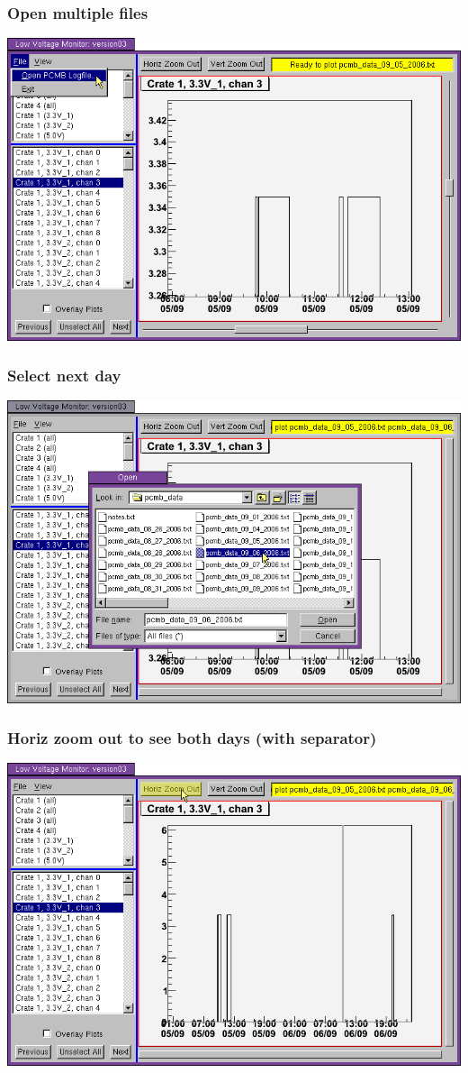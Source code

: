\documentclass[12pt,compress]{beamer}
\begin{document}
\begin{frame}
\frametitle{Open multiple files}
\begin{center}
\includegraphics[width=0.9\linewidth]{16.png}
\end{center}
\end{frame}

\begin{frame}
\frametitle{Select next day}
\begin{center}
\includegraphics[width=0.9\linewidth]{17.png}
\end{center}
\end{frame}

\begin{frame}
\frametitle{Horiz zoom out to see both days (with separator)}
\begin{center}
\includegraphics[width=0.9\linewidth]{18.png}
\end{center}
\label{numpages}
\end{frame}
\end{document}
